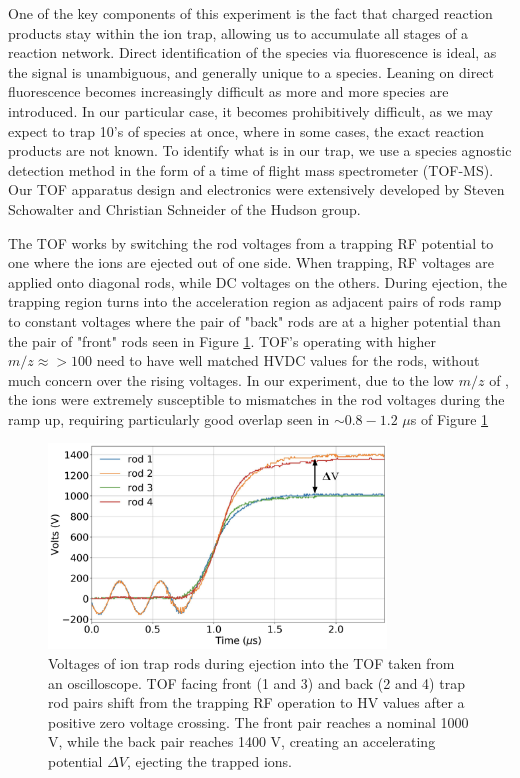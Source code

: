 One of the key components of this experiment is the fact that charged reaction products stay within the ion trap, allowing us to accumulate all stages of a reaction network. Direct identification of the species via fluorescence is ideal, as the signal is unambiguous, and generally unique to a species. Leaning on direct fluorescence becomes increasingly difficult as more and more species are introduced. In our particular case, it becomes prohibitively difficult, as we may expect to trap 10's of species at once, where in some cases, the exact reaction products are not known. To identify what is in our trap, we use a species agnostic detection method in the form of a time of flight mass spectrometer (TOF-MS). Our TOF apparatus design and electronics were extensively developed by Steven Schowalter and Christian Schneider of the Hudson group.\cite{Schowalter2012,Schneider2014}

The TOF works by switching the rod voltages from a trapping RF potential to one where the ions are ejected out of one side. When trapping, RF voltages are applied onto diagonal rods, while DC voltages on the others. During ejection, the trapping region turns into the acceleration region as adjacent pairs of rods ramp to constant voltages where the pair of "back" rods are at a higher potential than the pair of "front" rods seen in Figure \ref{fig: rod traces}. TOF's operating with higher $m/z \approx>100 $ need to have well matched HVDC values for the rods, without much concern over the rising voltages. In our experiment, due to the low $m/z$ of , the ions were extremely susceptible to mismatches in the rod voltages during the ramp up, requiring particularly good overlap seen in $\sim 0.8 - 1.2$ $\mu$s of Figure \ref{fig: rod traces}

\begin{figure}[H]
	\centering
	\includegraphics[width=0.8\textwidth]{images/rod_traces.pdf}
	\caption{Voltages of ion trap rods during ejection into the TOF taken from an oscilloscope. TOF facing front (1 and 3) and back (2 and 4) trap rod pairs shift from the trapping RF operation to HV values after a positive zero voltage crossing. The front pair reaches a nominal 1000 V, while the back pair reaches 1400 V, creating an accelerating potential $\Delta V$, ejecting the trapped ions.}
	\label{fig: rod traces}
\end{figure}

